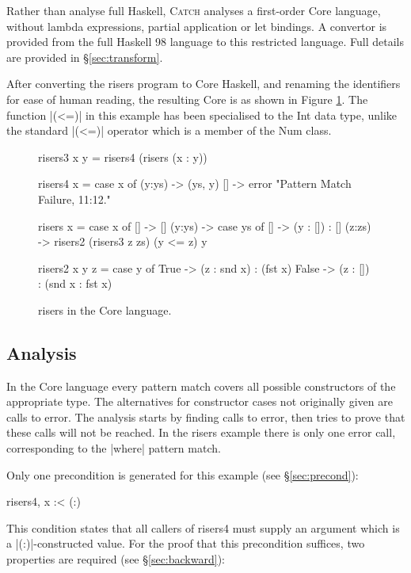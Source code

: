 \documentclass[preprint]{sigplanconf}
\newcommand{\C}[1]{\textsf{#1}}
\newcommand{\catch}{\textsc{Catch}}
\begin{document}
Rather than analyse full Haskell, \catch{} analyses a first-order Core language, without lambda expressions, partial application or let bindings. A convertor is provided from the full Haskell 98 language to this restricted language. Full details are provided in \S\ref{sec:transform}.

After converting the \C{risers} program to Core Haskell, and renaming the identifiers for ease of human reading, the resulting Core is as shown in Figure \ref{fig:risers_core}. The function |(<=)| in this example has been specialised to the Int data type, unlike the standard |(<=)| operator which is a member of the \C{Num} class.

\begin{figure}
\begin{code}
risers3 x y = risers4 (risers (x : y))

risers4 x = case x of
    (y:ys) -> (ys, y)
    [] -> error "Pattern Match Failure, 11:12."

risers x = case x of
    [] -> []
    (y:ys) ->  case ys of
         [] -> (y : []) : []
         (z:zs) -> risers2 (risers3 z zs) (y <= z) y

risers2 x y z =  case y of
    True -> (z : snd x) : (fst x)
    False -> (z : []) : (snd x : fst x)
\end{code}
\caption{\C{risers} in the Core language.}
\label{fig:risers_core}
\end{figure}

\subsection{Analysis}

In the Core language every pattern match covers all possible constructors of the appropriate type. The alternatives for constructor cases not originally given are calls to \C{error}. The analysis starts by finding calls to \C{error}, then tries to prove that these calls will not be reached. In the \C{risers} example there is only one \C{error} call, corresponding to the |where| pattern match.

Only one precondition is generated for this example (see \S\ref{sec:precond}):

\begin{code}
risers4, x :< (:)
\end{code}

This condition states that all callers of \C{risers4} must supply an argument which is a |(:)|-constructed value. For the proof that this precondition suffices, two properties are required (see \S\ref{sec:backward}):
\end{document}
